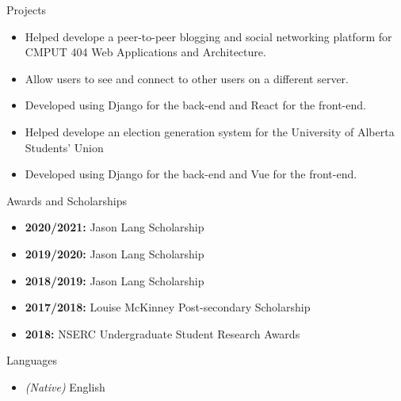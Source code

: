 \documentclass[]{mcdowellcv}
\begin{document}
\vspace*{-10pt}
\begin{cvsection}{Projects}
  \begin{cvsubsection}{}{}{}
    \begin{itemize}
      \item Helped develope a peer-to-peer blogging and social networking platform for CMPUT 404 Web Applications and Architecture.
      \item Allow users to see and connect to other users on a different server. 
      \item Developed using Django for the back-end and React for the front-end. 
    \end{itemize}
  \end{cvsubsection}

  \begin{cvsubsection}{}{}{}
    \begin{itemize}
      \item Helped develope an election generation system for the University of Alberta Students' Union
      \item Developed using Django for the back-end and Vue for the front-end.
    \end{itemize}
  \end{cvsubsection}
\end{cvsection}

\vspace*{-10pt}
\begin{cvsection}{Awards and Scholarships}
  \begin{cvsubsection}{}{}{}
    \begin{itemize}
      \item \textbf{2020/2021:} Jason Lang Scholarship
      \item \textbf{2019/2020:} Jason Lang Scholarship
      \item \textbf{2018/2019:} Jason Lang Scholarship
      \item \textbf{2017/2018:} Louise McKinney Post-secondary Scholarship 
      \item \textbf{2018:} NSERC Undergraduate Student Research Awards
    \end{itemize}
  \end{cvsubsection}
\end{cvsection}

\vspace*{-10pt}
\begin{cvsection}{Languages}
  \begin{cvsubsection}{}{}{}	
    \begin{itemize}
      \item \emph{(Native)} English  
    \end{itemize}
  \end{cvsubsection}
\end{cvsection}
\end{document}
